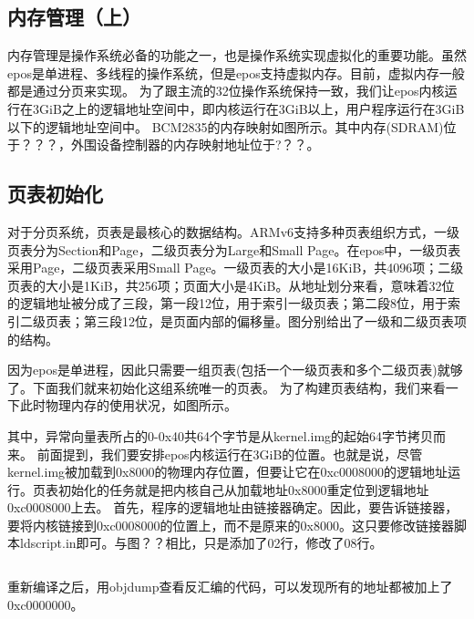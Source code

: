 \documentclass[main.tex]{subfiles}
\begin{document}
\ifxetex\else\begin{CJK*}{UTF8}{song}\fi

\chapter{内存管理（上）}
内存管理是操作系统必备的功能之一，也是操作系统实现虚拟化的重要功能。虽然epos是单进程、多线程的操作系统，但是epos支持虚拟内存。目前，虚拟内存一般都是通过分页来实现。
为了跟主流的32位操作系统保持一致，我们让epos内核运行在3GiB之上的逻辑地址空间中，即内核运行在3GiB以上，用户程序运行在3GiB以下的逻辑地址空间中。
BCM2835的内存映射如图所示。其中内存(SDRAM)位于？？？，外围设备控制器的内存映射地址位于?？？。

\section{页表初始化}
对于分页系统，页表是最核心的数据结构。ARMv6支持多种页表组织方式，一级页表分为Section和Page，二级页表分为Large和Small Page。在epos中，一级页表采用Page，二级页表采用Small Page。一级页表的大小是16KiB，共4096项；二级页表的大小是1KiB，共256项；页面大小是4KiB。从地址划分来看，意味着32位的逻辑地址被分成了三段，第一段12位，用于索引一级页表；第二段8位，用于索引二级页表；第三段12位，是页面内部的偏移量。图分别给出了一级和二级页表项的结构。

因为epos是单进程，因此只需要一组页表(包括一个一级页表和多个二级页表)就够了。下面我们就来初始化这组系统唯一的页表。
为了构建页表结构，我们来看一下此时物理内存的使用状况，如图所示。


其中，异常向量表所占的0-0x40共64个字节是从kernel.img的起始64字节拷贝而来。
前面提到，我们要安排epos内核运行在3GiB的位置。也就是说，尽管kernel.img被加载到0x8000的物理内存位置，但要让它在0xc0008000的逻辑地址运行。页表初始化的任务就是把内核自己从加载地址0x8000重定位到逻辑地址0xc0008000上去。
首先，程序的逻辑地址由链接器确定。因此，要告诉链接器，要将内核链接到0xc0008000的位置上，而不是原来的0x8000。这只要修改链接器脚本ldscript.in即可。与图？？相比，只是添加了02行，修改了08行。
\inputminted[linenos,numbersep=5pt,frame=lines,framesep=2mm]{c}{src/chapter04/kernel/kernel.ld.in}

重新编译之后，用objdump查看反汇编的代码，可以发现所有的地址都被加上了0xc0000000。



\end{CJK*}
\end{document}
